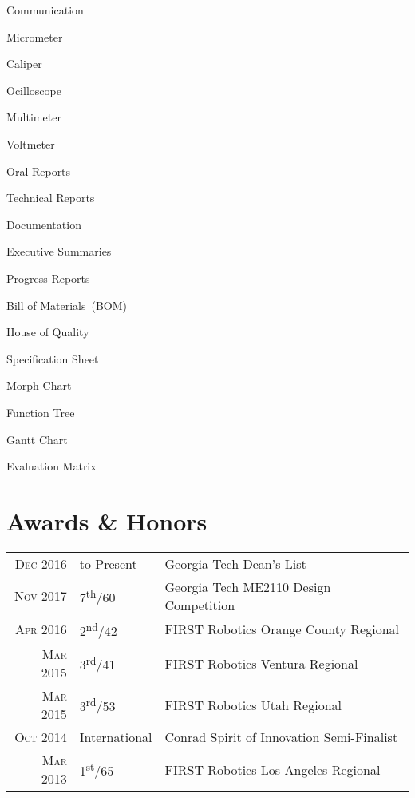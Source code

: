 \documentclass{resume}
\begin{document}
\begin{skills}{Communication}
\begin{commalist}
    \end{commalist}
  \item [Instruments]
    \begin{commalist}
      \item Micrometer
      \item Caliper
      \item Ocilloscope
      \item Multimeter
      \item Voltmeter
    \end{commalist}
  \item [Communication]
    \begin{commalist}
      \item Oral Reports
      \item Technical Reports
      \item Documentation
      \item Executive Summaries
      \item Progress Reports
      \item Bill of Materials~(BOM)
    \end{commalist}
  \item [Planning]
    \begin{commalist}
      \item House of Quality
      \item Specification Sheet
      \item Morph Chart
      \item Function Tree
      \item Gantt Chart
      \item Evaluation Matrix
    \end{commalist}
\end{skills}

\section{Awards \& Honors}
\begin{tabular}{rll}
  \textsc{Dec} 2016 & to Present & Georgia Tech Dean's List\\
  \textsc{Nov} 2017 & 7\textsuperscript{th}/60 & Georgia Tech ME2110 Design Competition\\
  \textsc{Apr} 2016 & 2\textsuperscript{nd}/42 & FIRST Robotics Orange County Regional\\
  \textsc{Mar} 2015 & 3\textsuperscript{rd}/41 & FIRST Robotics Ventura Regional\\
  \textsc{Mar} 2015 & 3\textsuperscript{rd}/53 & FIRST Robotics Utah Regional\\
  \textsc{Oct} 2014 & International & Conrad Spirit of Innovation Semi-Finalist\\
  \textsc{Mar} 2013 & 1\textsuperscript{st}/65 & FIRST Robotics Los Angeles Regional\\
\end{tabular}
\end{document}
